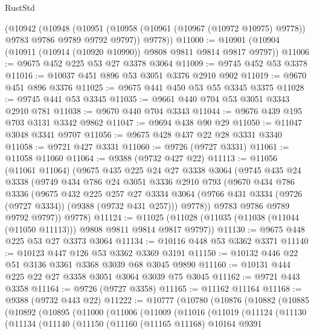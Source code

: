 \begin{lexlean}{RustStd}
\begin{coremodule}
    (@10942
      (@10948
        (@10951 (@10958 (@10961 (@10967 (@10972 @10975) @9778)) @9783 @9786 @9789 @9792 @9797))
        @9778))
@11000 := @10901 (@10904 (@10911 (@10914 (@10920 @10990)) @9808 @9811 @9814 @9817 @9797))
@11006 := @9675 @452 @225 @53 @27 @3378 @3064
@11009 := @9745 @452 @53 @3378
@11016 := @10037 @451 @896 @53 @3051 @3376 @2910 @902
@11019 := @9670 @451 @896 @3376
@11025 := @9675 @441 @450 @53 @55 @3345 @3375
@11028 := @9745 @441 @53 @3345
@11035 := @9661 @440 @704 @53 @3051 @3343 @2910 @781
@11038 := @9670 @440 @704 @3343
@11044 := @9676 @439 @195 @703 @3131 @3342 @9862
@11047 := @9694 @438 @90 @29
@11050 := @11047 @3048 @3341 @9707
@11056 := @9675 @428 @437 @22 @28 @3331 @3340
@11058 := @9721 @427 @3331
@11060 := @9726 (@9727 @3331)
@11061 := @11058 @11060
@11064 := @9388 (@9732 @427 @22)
@11113 := @11056
    (@11061 @11064)
    (@9675
      @435
      @225
      @24
      @27
      @3338
      @3064
      (@9745
        @435
        @24
        @3338
        (@9749
          @434
          @786
          @24
          @3051
          @3336
          @2910
          @793
          (@9670
            @434
            @786
            @3336
            (@9675
              @432
              @225
              @257
              @27
              @3334
              @3064
              (@9766 @431 @3334 (@9726 (@9727 @3334)) (@9388 (@9732 @431 @257)))
              @9778))
          @9783
          @9786
          @9789
          @9792
          @9797))
      @9778)
@11124 := @11025 (@11028 (@11035 (@11038 (@11044 (@11050 @11113))) @9808 @9811 @9814 @9817 @9797))
@11130 := @9675 @448 @225 @53 @27 @3373 @3064
@11134 := @10116 @448 @53 @3362 @3371
@11140 := @10123 @447 @126 @53 @3362 @3369 @3191
@11150 := @10132 @446 @22 @51 @3136 @3361 @3368 @3039 @68 @3045 @9890
@11160 := @10131 @444 @225 @22 @27 @3358 @3051 @3064 @3039 @75 @3045
@11162 := @9721 @443 @3358
@11164 := @9726 (@9727 @3358)
@11165 := @11162 @11164
@11168 := @9388 (@9732 @443 @22)
@11222 := @10777
    (@10780
      (@10876
        (@10882
          (@10885
            (@10892
              (@10895
                (@11000
                  (@11006
                    (@11009
                      (@11016
                        (@11019
                          (@11124
                            (@11130
                              (@11134
                                (@11140
                                  (@11150
                                    (@11160
                                      (@11165 @11168)
                                      @10164
                                      @9391

\end{coremodule}
\end{lexlean}
